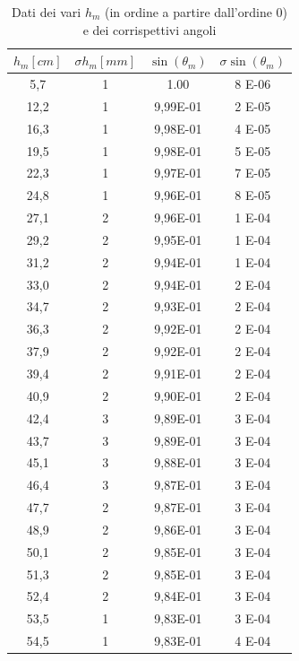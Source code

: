 \documentclass[10pt, a4paper, italian]{article}
\begin{document}
\begin{table}[]
\centering
\begin{tabular}{cc|cc}
\toprule
$h_m [cm]$ & $\sigma h_m [mm]$ & $\sin(\theta _m)$ & $\sigma \sin(\theta _m)$\\
\midrule
5,7 & 1 & 1.00& 8 E-06\\
12,2 & 1 & 9,99E-01 & 2 E-05 \\
16,3 & 1 & 9,98E-01 & 4 E-05 \\
19,5 & 1 & 9,98E-01 & 5 E-05 \\
22,3 & 1 & 9,97E-01 & 7 E-05 \\
24,8 & 1 & 9,96E-01 & 8 E-05 \\
27,1 & 2 & 9,96E-01 & 1 E-04 \\
29,2 & 2 & 9,95E-01 & 1 E-04 \\
31,2 & 2 & 9,94E-01 & 1 E-04 \\
33,0 & 2 & 9,94E-01 & 2 E-04 \\
34,7 & 2 & 9,93E-01 & 2 E-04 \\
36,3 & 2 & 9,92E-01 & 2 E-04 \\
37,9 & 2 & 9,92E-01 & 2 E-04 \\
39,4 & 2 & 9,91E-01 & 2 E-04 \\
40,9 & 2 & 9,90E-01 & 2 E-04 \\
42,4 & 3 & 9,89E-01 & 3 E-04 \\
43,7 & 3 & 9,89E-01 & 3 E-04 \\
45,1 & 3 & 9,88E-01 & 3 E-04 \\
46,4 & 3 & 9,87E-01 & 3 E-04 \\
47,7 & 2 & 9,87E-01 & 3 E-04 \\
48,9 & 2 & 9,86E-01 & 3 E-04 \\
50,1 & 2 & 9,85E-01 & 3 E-04 \\
51,3 & 2 & 9,85E-01 & 3 E-04 \\
52,4 & 2 & 9,84E-01 & 3 E-04 \\
53,5 & 1 & 9,83E-01 & 3 E-04 \\
54,5 & 1 & 9,83E-01 & 4 E-04
\end{tabular}
\caption{Dati dei vari $h_m$ (in ordine a partire dall'ordine 0) e dei corrispettivi angoli \label{hm}}
\end{table}
\end{document}
